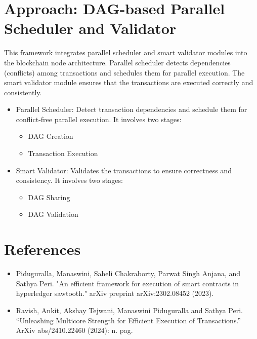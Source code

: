\documentclass[12pt]{article}
\begin{document}
\section*{Approach: DAG-based Parallel Scheduler and Validator}
This framework integrates parallel scheduler and smart validator modules into the blockchain node architecture. Parallel scheduler detects dependencies (conflicts) among transactions and schedules them for parallel execution. The smart validator module ensures that the transactions are executed correctly and consistently.
\begin{itemize}
    \item Parallel Scheduler: Detect transaction dependencies and schedule them for conflict-free parallel execution. It involves two stages: 
    \begin{itemize}
        \item DAG Creation
        \item Transaction Execution
    \end{itemize}
    \item Smart Validator: Validates the transactions to ensure correctness and consistency. It involves two stages:
    \begin{itemize}
        \item DAG Sharing
        \item DAG Validation
    \end{itemize}
\end{itemize}

\section*{References}
\begin{itemize}
    \item Piduguralla, Manaswini, Saheli Chakraborty, Parwat Singh Anjana, and Sathya Peri. "An efficient framework for execution of smart contracts in hyperledger sawtooth." arXiv preprint arXiv:2302.08452 (2023).
    \item Ravish, Ankit, Akshay Tejwani, Manaswini Piduguralla and Sathya Peri. “Unleashing Multicore Strength for Efficient Execution of Transactions.” ArXiv abs/2410.22460 (2024): n. pag.
\end{itemize}
\end{document}
